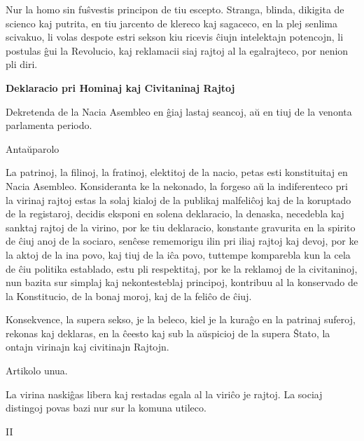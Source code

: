 \documentclass{book}
\newcommand{\eble}[1]{{\color{blue}#1}}
\begin{document}
Nur la homo sin \eble{fuŝvestis principon de tiu escepto}. Stranga,
blinda, dikigita de scienco kaj putrita, en tiu jarcento de klereco kaj
sagaceco, en la plej senlima scivakuo, li volas despote estri sekson kiu
ricevis ĉiujn intelektajn potencojn, li postulas ĝui la Revolucio, kaj
\eble{reklamacii} siaj rajtoj \eble{al} la egalrajteco, por nenion pli
diri.

\vspace{2em}
\noindent\textbf{Deklaracio pri Hominaj kaj Civitaninaj Rajtoj}
\vspace{1em}

Dekretenda de la \eble{Nacia Asembleo} en ĝiaj lastaj seancoj, aŭ en tiuj
de la venonta parlamenta periodo.

\vspace{1em}
\indent\indent\indent\indent Antaŭparolo
\vspace{0.5em}

La patrinoj, la filinoj, la fratinoj, elektitoj de la nacio, petas \eble{esti
konstituitaj} en \eble{Nacia Asembleo}. Konsideranta ke la nekonado, la
forgeso aŭ la indiferenteco pri la virinaj rajtoj estas la solaj kialoj de
la publikaj malfeliĉoj kaj de la koruptado de la registaroj, decidis
eksponi en solena deklaracio, la denaska, necedebla kaj sanktaj rajtoj de
la virino, por ke tiu deklaracio, konstante gravurita en la spirito de ĉiuj
anoj de la sociaro, senĉese rememorigu ilin pri iliaj rajtoj kaj devoj,
por ke la aktoj de la ina povo, kaj tiuj de la iĉa povo, tuttempe
komparebla kun la cela de ĉiu politika establado, estu pli respektitaj, por
ke la reklamoj de la civitaninoj, nun bazita sur simplaj kaj nekontesteblaj
principoj, kontribuu al la konservado de la Konstitucio, de la bonaj moroj,
kaj de la feliĉo de ĉiuj.

Konsekvence, la supera sekso, je la beleco, kiel je la kuraĝo en la
patrinaj suferoj, rekonas kaj deklaras, en la ĉeesto kaj sub la aŭspicioj
de la supera Ŝtato, la ontajn virinajn kaj civitinajn Rajtojn.

\vspace{1em}
\indent\indent\indent\indent Artikolo unua.
\vspace{0.5em}

La virina naskiĝas libera kaj restadas egala al la viriĉo je rajtoj. La
sociaj distingoj povas bazi nur sur la komuna utileco.


\vspace{1em}
\indent\indent\indent\indent II
\vspace{0.5em}
\end{document}

